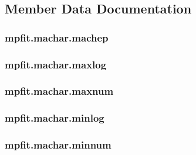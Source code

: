 \subsection{Member Data Documentation}
\hypertarget{classmpfit_1_1machar_a3f4c542f8c12eadb7fd7899b85e7418f}{
\subsubsection[{machep}]{\setlength{\rightskip}{0pt plus 5cm}mpfit.\-machar.\-machep}}\label{classmpfit_1_1machar_a3f4c542f8c12eadb7fd7899b85e7418f}
\hypertarget{classmpfit_1_1machar_a038d6337e708014cfb3efedc9fdb4fc8}{
\subsubsection[{maxlog}]{\setlength{\rightskip}{0pt plus 5cm}mpfit.\-machar.\-maxlog}}\label{classmpfit_1_1machar_a038d6337e708014cfb3efedc9fdb4fc8}
\hypertarget{classmpfit_1_1machar_ab572a985f979d3940525b5867deafb86}{
\subsubsection[{maxnum}]{\setlength{\rightskip}{0pt plus 5cm}mpfit.\-machar.\-maxnum}}\label{classmpfit_1_1machar_ab572a985f979d3940525b5867deafb86}
\hypertarget{classmpfit_1_1machar_af01c85a38dbf4a94ae46170e4306baf9}{
\subsubsection[{minlog}]{\setlength{\rightskip}{0pt plus 5cm}mpfit.\-machar.\-minlog}}\label{classmpfit_1_1machar_af01c85a38dbf4a94ae46170e4306baf9}
\hypertarget{classmpfit_1_1machar_a81a54c7e41c2ef0471983156b9d18b19}{
\subsubsection[{minnum}]{\setlength{\rightskip}{0pt plus 5cm}mpfit.\-machar.\-minnum}}\label{classmpfit_1_1machar_a81a54c7e41c2ef0471983156b9d18b19}
